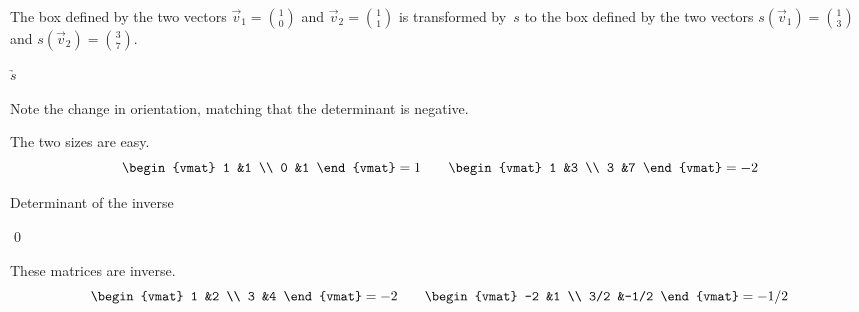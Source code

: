 \begin{frame} 
The box defined by the two vectors $\vec{v}_1=\binom{1}{0}$ and
$\vec{v}_2=\binom{1}{1}$ is transformed by~$s$ to the box defined by the 
two vectors $s(\vec{v}_1)=\binom{1}{3}$ and 
$s(\vec{v}_2)=\binom{3}{7}$. 
\begin{center}
  \qquad$\underrightarrow{s}$\qquad
\end{center}
Note the change in orientation, matching that the determinant is 
negative.

\pause
The two sizes are easy.
\begin{equation*}
  \begin{vmat}
    1 &1 \\ 
    0 &1  
  \end{vmat}
  =1
  \qquad
  \begin{vmat}
    1 &3 \\ 
    3 &7  
  \end{vmat}
  =-2
\end{equation*}
\end{frame}


\begin{frame}{Determinant of the inverse}
\co[co:DeterminantOfInverseIsInverseOfDeterminant]  

\pause
\pf
{}
\qed

\ex These matrices are inverse.
\begin{equation*}
  \begin{vmat}
    1 &2 \\
    3  &4
  \end{vmat}
  =-2
  \qquad
  \begin{vmat}
    -2 &1 \\
    3/2  &-1/2
  \end{vmat}
  =-1/2
\end{equation*}

\end{frame}




